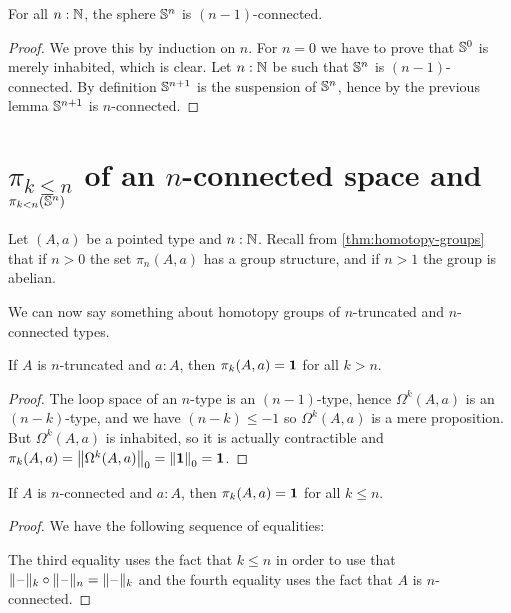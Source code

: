 \begin{cor} \label{cor:sn-connected}
  For all $n:\N$, the sphere $\Sn^n$ is $(n-1)$-connected.
\end{cor}

\begin{proof}
  We prove this by induction on $n$.
  For $n=0$ we have to prove that $\Sn^0$ is merely inhabited, which is clear.
  Let $n:\N$ be such that $\Sn^n$ is $(n-1)$-connected. By definition $\Sn^{n+1}$
  is the suspension of $\Sn^n$, hence by the previous lemma $\Sn^{n+1}$ is
  $n$-connected.
\end{proof}

\section{\texorpdfstring{$\pi_{k \le n}$}{π\_(k≤n)} of an \texorpdfstring{$n$}{n}-connected space and \texorpdfstring{$\pi_{k < n}(\Sn ^n)$}{π\_(k<n)(Sⁿ)}}
\label{sec:pik-le-n}

Let $(A,a)$ be a pointed type and $n:\N$.  Recall from
\autoref{thm:homotopy-groups} that if $n>0$ the set $\pi_n(A,a)$ has a group
structure, and if $n>1$ the group is abelian.

We can now say something about homotopy groups of $n$-truncated and
$n$-connected types.

\begin{lem}
  If $A$ is $n$-truncated and $a:A$, then $\pi_k(A,a)=\unit$ for all $k>n$.
\end{lem}

\begin{proof}
  The loop space of an $n$-type  is an
  $(n-1)$-type, hence $\Omega^k(A,a)$ is an $(n-k)$-type, and we have
  $(n-k)\le-1$ so $\Omega^k(A,a)$ is a mere proposition. But $\Omega^k(A,a)$ is inhabited,
  so it is actually contractible and
  $\pi_k(A,a)=\trunc0{\Omega^k(A,a)}=\trunc0{\unit}=\unit$.
\end{proof}

\begin{lem} \label{lem:pik-nconnected}
  If $A$ is $n$-connected and $a:A$, then $\pi_k(A,a)=\unit$ for all $k\le{}n$.
\end{lem}

\begin{proof}
  We have the following sequence of equalities:
  The third equality uses the fact that $k\le{}n$ in order to use that
  $\truncf k\circ\truncf n=\truncf k$ and the fourth equality uses the fact that $A$ is
  $n$-connected.
\end{proof}

